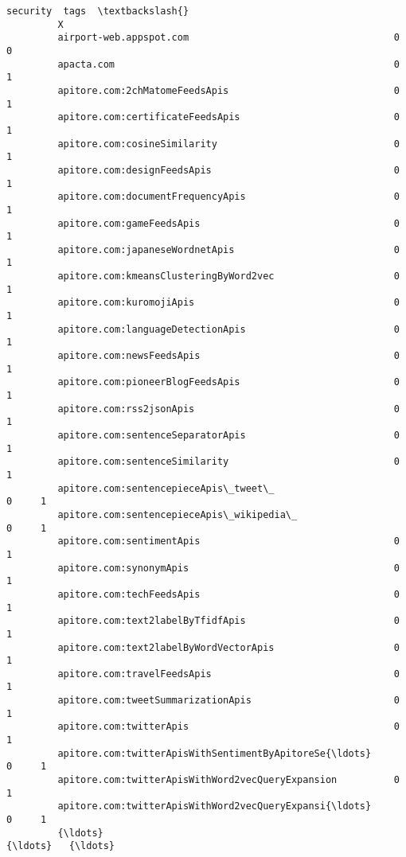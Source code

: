 \documentclass[11pt]{article}
\begin{document}
\begin{Verbatim}[commandchars=\\\{\}]
                                                             security  tags  \textbackslash{}
         X                                                                    
         airport-web.appspot.com                                    0     0   
         apacta.com                                                 0     1   
         apitore.com:2chMatomeFeedsApis                             0     1   
         apitore.com:certificateFeedsApis                           0     1   
         apitore.com:cosineSimilarity                               0     1   
         apitore.com:designFeedsApis                                0     1   
         apitore.com:documentFrequencyApis                          0     1   
         apitore.com:gameFeedsApis                                  0     1   
         apitore.com:japaneseWordnetApis                            0     1   
         apitore.com:kmeansClusteringByWord2vec                     0     1   
         apitore.com:kuromojiApis                                   0     1   
         apitore.com:languageDetectionApis                          0     1   
         apitore.com:newsFeedsApis                                  0     1   
         apitore.com:pioneerBlogFeedsApis                           0     1   
         apitore.com:rss2jsonApis                                   0     1   
         apitore.com:sentenceSeparatorApis                          0     1   
         apitore.com:sentenceSimilarity                             0     1   
         apitore.com:sentencepieceApis\_tweet\_                       0     1   
         apitore.com:sentencepieceApis\_wikipedia\_                   0     1   
         apitore.com:sentimentApis                                  0     1   
         apitore.com:synonymApis                                    0     1   
         apitore.com:techFeedsApis                                  0     1   
         apitore.com:text2labelByTfidfApis                          0     1   
         apitore.com:text2labelByWordVectorApis                     0     1   
         apitore.com:travelFeedsApis                                0     1   
         apitore.com:tweetSummarizationApis                         0     1   
         apitore.com:twitterApis                                    0     1   
         apitore.com:twitterApisWithSentimentByApitoreSe{\ldots}         0     1   
         apitore.com:twitterApisWithWord2vecQueryExpansion          0     1   
         apitore.com:twitterApisWithWord2vecQueryExpansi{\ldots}         0     1   
         {\ldots}                                                      {\ldots}   {\ldots}   

\end{Verbatim}
\end{document}

